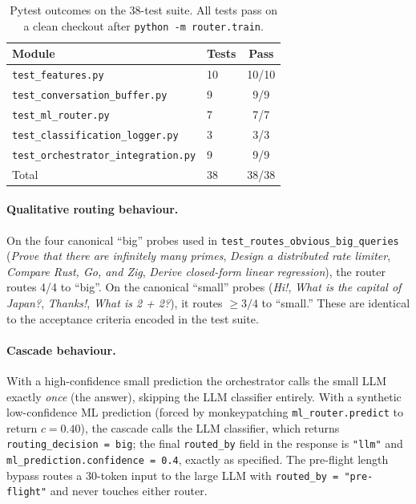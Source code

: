 \documentclass{article}
\begin{document}
\begin{table}[h]
  \caption{Pytest outcomes on the 38-test suite. All tests pass on a clean
  checkout after \texttt{python -m router.train}.}
  \label{tab:tests}
  \centering
  \begin{tabular}{llc}
    \toprule
    Module & Tests & Pass \\
    \midrule
    \texttt{test\_features.py}               & 10 & 10/10 \\
    \texttt{test\_conversation\_buffer.py}   & 9  & 9/9 \\
    \texttt{test\_ml\_router.py}             & 7  & 7/7 \\
    \texttt{test\_classification\_logger.py} & 3  & 3/3 \\
    \texttt{test\_orchestrator\_integration.py} & 9 & 9/9 \\
    \midrule
    Total                                    & 38 & 38/38 \\
    \bottomrule
  \end{tabular}
\end{table}

\paragraph{Qualitative routing behaviour.} On the four canonical ``big''
probes used in \texttt{test\_routes\_obvious\_big\_queries}
(\emph{Prove that there are infinitely many primes}, \emph{Design a
distributed rate limiter}, \emph{Compare Rust, Go, and Zig}, \emph{Derive
closed-form linear regression}), the router routes 4/4 to ``big''. On the
canonical ``small'' probes (\emph{Hi!}, \emph{What is the capital of
Japan?}, \emph{Thanks!}, \emph{What is 2 + 2?}), it routes $\geq 3/4$ to
``small.'' These are identical to the acceptance criteria encoded in the
test suite.

\paragraph{Cascade behaviour.} With a high-confidence small prediction the
orchestrator calls the small LLM exactly \emph{once} (the answer), skipping
the LLM classifier entirely. With a synthetic low-confidence ML prediction
(forced by monkeypatching \texttt{ml\_router.predict} to return
$c = 0.40$), the cascade calls the LLM classifier, which returns
\texttt{routing\_decision = big}; the final \texttt{routed\_by} field in the
response is \texttt{"llm"} and \texttt{ml\_prediction.confidence = 0.4},
exactly as specified. The pre-flight length bypass routes a 30-token input
to the large LLM with \texttt{routed\_by = "pre-flight"} and never touches
either router.
\end{document}
